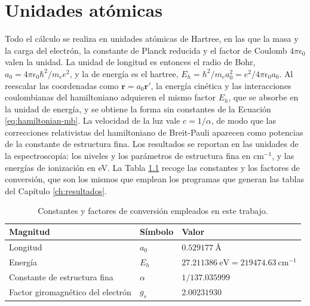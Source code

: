 \chapter{Unidades atómicas}
\label{ap:unidades-atomicas}

Todo el cálculo se realiza en unidades atómicas de Hartree, en las que la masa y la carga del electrón, la constante de Planck reducida y el factor de Coulomb $4\pi\epsilon_0$ valen la unidad. La unidad de longitud es entonces el radio de Bohr, $a_0 = 4\pi\epsilon_0\hbar^2/m_e e^2$, y la de energía es el hartree, $E_h = \hbar^2/m_e a_0^2 = e^2/4\pi\epsilon_0 a_0$. Al reescalar las coordenadas como $\bm{r} = a_0\bm{r}'$, la energía cinética y las interacciones coulombianas del hamiltoniano adquieren el mismo factor $E_h$, que se absorbe en la unidad de energía, y se obtiene la forma sin constantes de la Ecuación \eqref{eq:hamiltonian-mb}. La velocidad de la luz vale $c = 1/\alpha$, de modo que las correcciones relativistas del hamiltoniano de Breit-Pauli aparecen como potencias de la constante de estructura fina. Los resultados se reportan en las unidades de la espectroscopía: los niveles y los parámetros de estructura fina en cm$^{-1}$, y las energías de ionización en eV. La Tabla \ref{tab:unidades} recoge las constantes y los factores de conversión, que son los mismos que emplean los programas que generan las tablas del Capítulo \ref{ch:resultados}.

\begin{table}[htbp]
    \centering
    \begin{tabular}{lll}
        \toprule
        \textbf{Magnitud} & \textbf{Símbolo} & \textbf{Valor} \\
        \midrule
        Longitud & $a_0$ & $0.529177\ \text{\AA}$ \\
        Energía & $E_h$ & $27.211386\ \text{eV} = 219474.63\ \text{cm}^{-1}$ \\
        Constante de estructura fina & $\alpha$ & $1/137.035999$ \\
        Factor giromagnético del electrón & $g_s$ & $2.00231930$ \\
        \bottomrule
    \end{tabular}
    \caption[Constantes y factores de conversión]{Constantes y factores de conversión empleados en este trabajo.}
    \label{tab:unidades}
\end{table}

